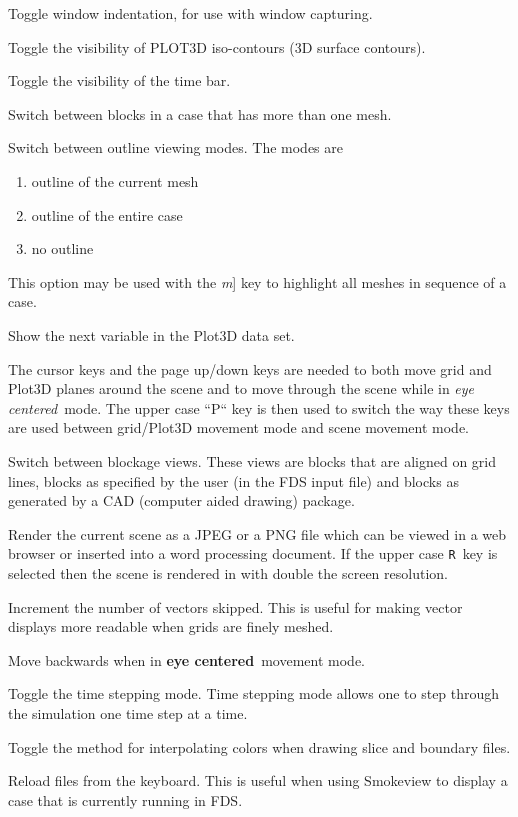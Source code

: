 \documentclass[11pt,twoside]{book}
\newcommand{\hitem}[1]{\item[{\bf #1} \hfill]}
\begin{document}
\hitem{h}Toggle window indentation, for
use with window capturing.

\hitem{i}Toggle the visibility of PLOT3D iso-contours (3D surface
contours).

\hitem{k}Toggle the visibility of the time bar.

\hitem{m}Switch between blocks in a case that has more than one
mesh.

\hitem{o}Switch between outline viewing modes. The modes are
\begin{enumerate}
\item outline of the current mesh
\item outline of the entire case
\item no outline
\end{enumerate}
This option may be used with the {\em m}] key to highlight all meshes in sequence of a case.

\hitem{p}Show the next variable in the Plot3D data set.

\hitem{P}The cursor keys and the page up/down keys are needed to
both move grid and Plot3D planes around the scene and to move
through the scene while in {\em eye centered}\ mode.  The upper case
``P`` key is then used to switch the way these keys are used
between grid/Plot3D movement mode and scene movement mode.


\hitem{q}Switch between blockage views.  These views are
blocks that are aligned on grid lines, blocks as specified
by the user (in the FDS input file) and blocks as generated by
a CAD (computer aided drawing) package.

\hitem{r,R}Render the current scene as a JPEG or a PNG file
which can be viewed in a web browser or inserted into a
word processing document.  If the upper case {\tt R}\ key
is selected then the scene is rendered in with double the screen resolution.

\hitem{s}Increment the number of vectors skipped. This is useful
for making vector displays more readable when grids are finely
meshed.

\hitem{s}Move backwards when in {\bf eye centered}\ movement mode.

\hitem{t}Toggle the time stepping mode.  Time stepping mode allows one
to step through the simulation one time step at a time.

\hitem{T}Toggle the method for interpolating colors when drawing slice and boundary files.

\hitem{u}Reload files from the keyboard.  This is useful when using
Smokeview to display a case that is currently running in
FDS.
\end{document}
